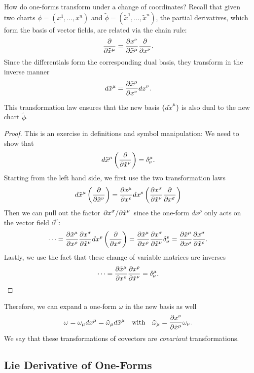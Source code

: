 How do one-forms transform under a change of coordinates?
Recall that given two charts $\phi = (x^1, \dots, x^n)$ and $\widetilde\phi = (\tilde x^1, \dots, \tilde x^n)$, the partial derivatives, which form the basis of vector fields, are related via the chain rule:
\begin{equation}
  \pdv{}{\tilde x^\mu} = \pdv{x^\nu}{\tilde x^\mu} \pdv{}{x^\nu}.
\end{equation}
Since the differentials form the corresponding dual basis, they transform in the inverse manner
\begin{equation}
  d\tilde x^\mu = \pdv{\tilde x^\mu}{x^\nu} dx^\nu.
\end{equation}
\begin{claim}
  This transformation law ensures that the new basis $\{d \tilde x^\mu\}$ is also dual to the new chart $\widetilde \phi$.
\end{claim}
\begin{proof}
  This is an exercise in definitions and symbol manipulation:
  We need to show that 
  \begin{equation}
    d \tilde x^\mu \left( \pdv{}{\tilde x^\nu} \right) = \delta^\mu_\nu.
  \end{equation}
  Starting from the left hand side, we first use the two transformation laws
  \begin{equation}
    d \tilde x^\mu \left( \pdv{}{\tilde x^\nu} \right) = \pdv{\tilde x^\mu}{x^\rho} dx^\rho \left( \pdv{x^\sigma}{\tilde x^\nu} \pdv{}{x^\sigma} \right)
  \end{equation}
  Then we can pull out the factor $\pdv*{x^\sigma}{\tilde x^\nu}$ since the one-form $dx^\rho$ only acts on the vector field $\partial^\sigma$:
  \begin{equation}
    \dots = \pdv{\tilde x^\mu}{x^\rho} \pdv{x^\sigma}{\tilde x^\nu} dx^\rho \left( \pdv{}{x^\sigma} \right) = \pdv{\tilde x^\mu}{x^\rho} \pdv{x^\sigma}{\tilde x^\nu} \delta^\rho_\sigma = \pdv{\tilde x^\mu}{x^\rho} \pdv{x^\sigma}{\tilde x^\rho}.
  \end{equation}
  Lastly, we use the fact that these change of variable matrices are inverses
  \begin{equation}
    \dots =\pdv{\tilde x^\mu}{x^\rho} \pdv{x^\rho}{\tilde x^\nu} = \delta^\mu_\nu.
  \end{equation}
\end{proof}
Therefore, we can expand a one-form $\omega$ in the new basis as well
\begin{equation}
  \omega = \omega_\mu dx^\mu = \tilde \omega _\mu d\tilde x^\mu \quad \text{with} \quad \tilde \omega_\mu = \pdv{x^\nu}{\tilde x^\mu} \omega_\nu.
\end{equation}
We say that these transformations of covectors are \emph{covariant} transformations.

\subsection{Lie Derivative of One-Forms}%
\label{sub:lie_derivative_of_one_forms}



